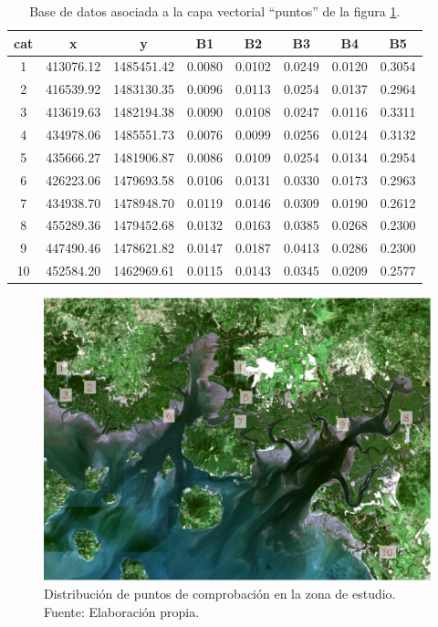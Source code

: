 \begin{table}[ht]
	\centering
	\caption[Base de datos de puntos de comprobación]{Base de datos asociada a la capa vectorial ``puntos'' de la figura \ref{fig:dist_puntos}.}
	\begin{tabular}{@{}cccccccc@{}}
	\toprule[0.4mm]
	cat & x & y & B1 & B2 & B3 & B4 & B5\\
	\midrule
	1 & 413076.12 & 1485451.42 & 0.0080 & 0.0102 & 0.0249 & 0.0120 & 0.3054\\
	2 & 416539.92 & 1483130.35 & 0.0096 & 0.0113 & 0.0254 & 0.0137 & 0.2964\\
	3 & 413619.63 & 1482194.38 & 0.0090 & 0.0108 & 0.0247 & 0.0116 & 0.3311\\
	4 & 434978.06 & 1485551.73 & 0.0076 & 0.0099 & 0.0256 & 0.0124 & 0.3132\\
	5 & 435666.27 & 1481906.87 & 0.0086 & 0.0109 & 0.0254 & 0.0134 & 0.2954\\
	6 & 426223.06 & 1479693.58 & 0.0106 & 0.0131 & 0.0330 & 0.0173 & 0.2963\\
	7 & 434938.70 & 1478948.70 & 0.0119 & 0.0146 & 0.0309 & 0.0190 & 0.2612\\
	8 & 455289.36 & 1479452.68 & 0.0132 & 0.0163 & 0.0385 & 0.0268 & 0.2300\\
	9 & 447490.46 & 1478621.82 & 0.0147 & 0.0187 & 0.0413 & 0.0286 & 0.2300\\
	10 & 452584.20 & 1462969.61 & 0.0115 & 0.0143 & 0.0345 & 0.0209 & 0.2577\\
	\bottomrule[0.4mm]
	\end{tabular}
	\label{tab:tabla_puntos}
\end{table}

\begin{figure}
	\centering
	\includegraphics[width=0.8\linewidth]{./Imagenes/puntos_comprob.eps}
	\caption[Distribución de puntos]{Distribución de puntos de comprobación en la zona de estudio. Fuente: Elaboración propia.}
	\label{fig:dist_puntos}
\end{figure}

